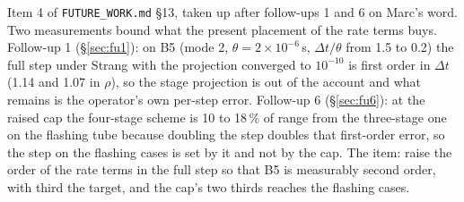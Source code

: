 \documentclass[11pt,a4paper]{article}
\newcommand{\code}[1]{\texttt{\small #1}}
\newcommand{\Dt}{\Delta t}
\begin{document}
Item 4 of \code{FUTURE\_WORK.md} \S13, taken up after follow-ups 1
and 6 on Marc's word.  Two measurements bound what the present
placement of the rate terms buys.  Follow-up 1 (\S\ref{sec:fu1}): on
B5 (mode 2, $\theta = 2\times10^{-6}$\,s, $\Dt/\theta$ from 1.5 to
0.2) the full step under Strang with the projection converged to
$10^{-10}$ is first order in $\Dt$ (1.14 and 1.07 in $\rho$), so the
stage projection is out of the account and what remains is the
operator's own per-step error.  Follow-up 6 (\S\ref{sec:fu6}): at the
raised cap the four-stage scheme is 10 to 18\,\% of range from the
three-stage one on the flashing tube because doubling the step doubles
that first-order error, so the step on the flashing cases is set by it
and not by the cap.  The item: raise the order of the rate terms in the
full step so that B5 is measurably second order, with third the target,
and the cap's two thirds reaches the flashing cases.
\end{document}
